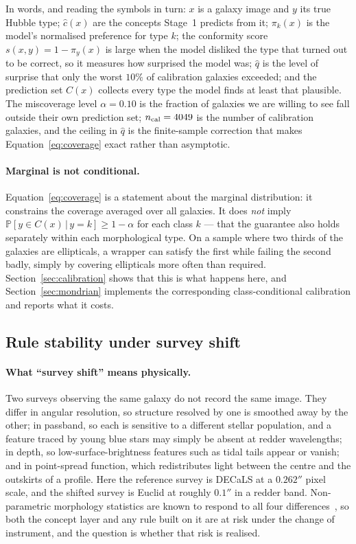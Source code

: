 \documentclass[11pt]{article}
\begin{document}
In words, and reading the symbols in turn: $x$ is a galaxy image and $y$ its
true Hubble type; $\hat c(x)$ are the concepts Stage~1 predicts from it;
$\pi_k(x)$ is the model's normalised preference for type $k$; the conformity
score $s(x,y) = 1 - \pi_y(x)$ is large when the model disliked the type that
turned out to be correct, so it measures how surprised the model was; $\hat q$
is the level of surprise that only the worst $10\%$ of calibration galaxies
exceeded; and the prediction set $C(x)$ collects every type the model finds at
least that plausible. The miscoverage level $\alpha = 0.10$ is the fraction of
galaxies we are willing to see fall outside their own prediction set;
$n_{\rm cal} = 4049$ is the number of calibration galaxies, and the ceiling in
$\hat q$ is the finite-sample correction that makes
Equation~\eqref{eq:coverage} exact rather than asymptotic.

\paragraph{Marginal is not conditional.}
Equation~\eqref{eq:coverage} is a statement about the marginal distribution:
it constrains the coverage averaged over all galaxies. It does \emph{not}
imply $\mathbb{P}[y \in C(x)\,|\,y=k] \ge 1-\alpha$ for each class $k$ --- that
the guarantee also holds separately within each morphological type. On a
sample where two thirds of the galaxies are ellipticals, a wrapper can satisfy
the first while failing the second badly, simply by covering ellipticals more
often than required. Section~\ref{sec:calibration} shows that this is what
happens here, and Section~\ref{sec:mondrian} implements the corresponding
class-conditional calibration and reports what it costs.

\subsection{Rule stability under survey shift}
\label{sec:stability}

\paragraph{What ``survey shift'' means physically.}
Two surveys observing the same galaxy do not record the same image. They
differ in angular resolution, so structure resolved by one is smoothed away by
the other; in passband, so each is sensitive to a different stellar
population, and a feature traced by young blue stars may simply be absent at
redder wavelengths; in depth, so low-surface-brightness features such as tidal
tails appear or vanish; and in point-spread function, which redistributes
light between the centre and the outskirts of a profile. Here the reference
survey is DECaLS at a $0.262''$ pixel scale, and the shifted survey is Euclid
at roughly $0.1''$ in a redder band. Non-parametric morphology statistics are
known to respond to all four differences~\citep{ferrari2015}, so both the
concept layer and any rule built on it are at risk under the change of
instrument, and the question is whether that risk is realised.
\end{document}
